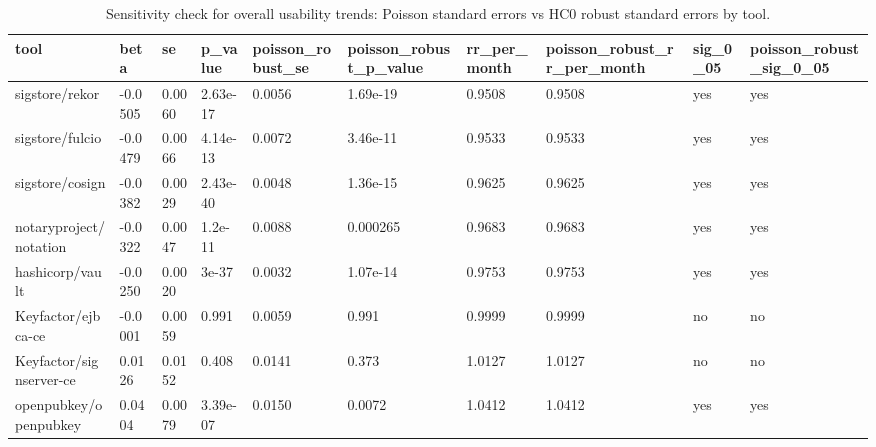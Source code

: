 \begin{table}[t]
\centering
\caption{Sensitivity check for overall usability trends: Poisson standard errors vs HC0 robust standard errors by tool.}
\label{tab:poisson-overall-trends-robust-se}
\scriptsize
\begin{tabular}{llllllllll}
\hline
tool & beta & se & p\_value & poisson\_robust\_se & poisson\_robust\_p\_value & rr\_per\_month & poisson\_robust\_rr\_per\_month & sig\_0\_05 & poisson\_robust\_sig\_0\_05 \\
\hline
sigstore/rekor & -0.0505 & 0.0060 & 2.63e-17 & 0.0056 & 1.69e-19 & 0.9508 & 0.9508 & yes & yes \\
sigstore/fulcio & -0.0479 & 0.0066 & 4.14e-13 & 0.0072 & 3.46e-11 & 0.9533 & 0.9533 & yes & yes \\
sigstore/cosign & -0.0382 & 0.0029 & 2.43e-40 & 0.0048 & 1.36e-15 & 0.9625 & 0.9625 & yes & yes \\
notaryproject/notation & -0.0322 & 0.0047 & 1.2e-11 & 0.0088 & 0.000265 & 0.9683 & 0.9683 & yes & yes \\
hashicorp/vault & -0.0250 & 0.0020 & 3e-37 & 0.0032 & 1.07e-14 & 0.9753 & 0.9753 & yes & yes \\
Keyfactor/ejbca-ce & -0.0001 & 0.0059 & 0.991 & 0.0059 & 0.991 & 0.9999 & 0.9999 & no & no \\
Keyfactor/signserver-ce & 0.0126 & 0.0152 & 0.408 & 0.0141 & 0.373 & 1.0127 & 1.0127 & no & no \\
openpubkey/openpubkey & 0.0404 & 0.0079 & 3.39e-07 & 0.0150 & 0.0072 & 1.0412 & 1.0412 & yes & yes \\
\hline
\end{tabular}
\end{table}
